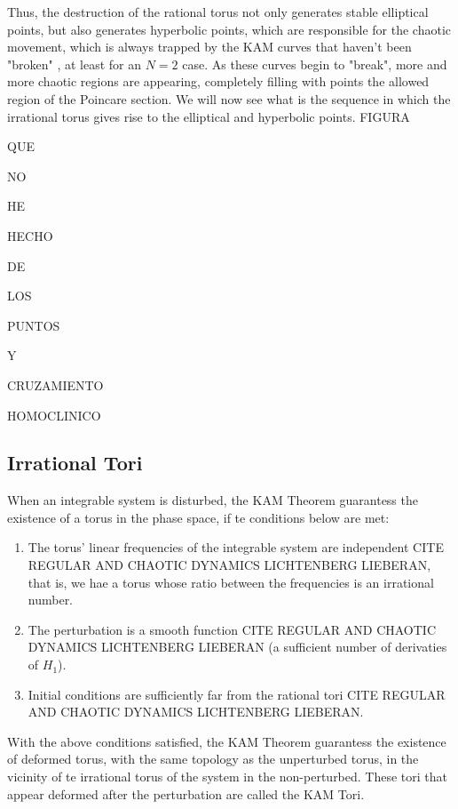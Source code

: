 Thus, the destruction of the rational torus not only generates stable elliptical points, but also generates hyperbolic points, which are responsible for the chaotic movement, which is always trapped by the KAM curves that haven't been "broken" \cite{ottChaosDynamicalSystems2002}, at least for an $N=2$ case. As these curves begin to "break", more and more chaotic regions are appearing, completely filling with points the allowed region of the Poincar\´e section. We will now see what is the sequence in which the irrational torus gives rise to the elliptical and hyperbolic points.
FIGURA\par
QUE\par
NO\par
HE\par
HECHO\par
DE\par
LOS\par
PUNTOS\par
Y\par
CRUZAMIENTO\par
HOMOCLINICO\par





\subsection{Irrational Tori}
When an integrable system is disturbed, the KAM Theorem guarantess the existence of a torus in the phase space, if te conditions below are met:
\begin{enumerate}
\item The torus' linear frequencies of the integrable system are independent	 CITE REGULAR AND CHAOTIC DYNAMICS LICHTENBERG LIEBERAN, that is, we hae a torus whose ratio between the frequencies is an irrational number.
\item The perturbation is a smooth function CITE REGULAR AND CHAOTIC DYNAMICS LICHTENBERG LIEBERAN (a sufficient number of derivaties of $H_1$).
\item Initial conditions are sufficiently far from the rational tori CITE REGULAR AND CHAOTIC DYNAMICS LICHTENBERG LIEBERAN.
\end{enumerate}
With the above conditions satisfied, the KAM Theorem guarantess the existence of deformed torus, with the same topology as the unperturbed torus, in the vicinity of te irrational torus of the system in the non-perturbed. These tori that appear deformed after the perturbation are called the KAM Tori.\par

